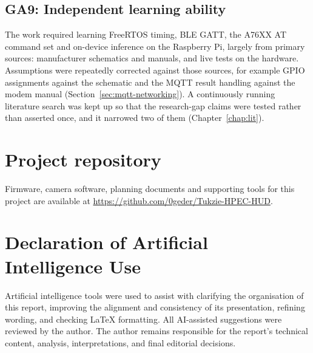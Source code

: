 \subsection*{GA9: Independent learning ability}
The work required learning FreeRTOS timing, BLE GATT, the A76XX AT command set and on-device inference on the Raspberry Pi, largely from primary sources: manufacturer schematics and manuals, and live tests on the hardware. Assumptions were repeatedly corrected against those sources, for example GPIO assignments against the schematic and the MQTT result handling against the modem manual (Section~\ref{sec:mqtt-networking}). A continuously running literature search was kept up so that the research-gap claims were tested rather than asserted once, and it narrowed two of them (Chapter~\ref{chap:lit}).

\section{Project repository}

Firmware, camera software, planning documents and supporting tools for this project are available at \url{https://github.com/0geder/Tukzie-HPEC-HUD}.

\section{Declaration of Artificial Intelligence Use}
\label{app:ai}

Artificial intelligence tools were used to assist with clarifying the organisation of this report, improving the alignment and consistency of its presentation, refining wording, and checking LaTeX formatting. All AI-assisted suggestions were reviewed by the author. The author remains responsible for the report's technical content, analysis, interpretations, and final editorial decisions.

